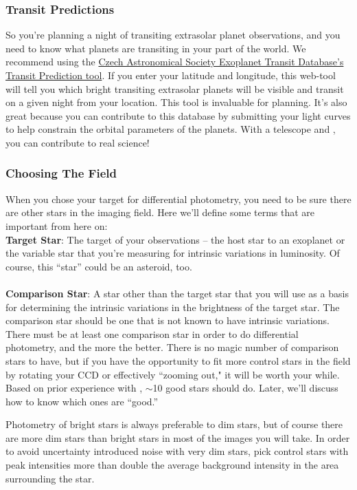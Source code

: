 \documentclass{article}
\begin{document}
\subsubsection{Transit Predictions}
So you're planning a night of transiting extrasolar planet observations, and you need to know what planets are transiting in your part of the world. We recommend using the \href{http://var2.astro.cz/ETD/predictions.php}{Czech Astronomical Society Exoplanet Transit Database's Transit Prediction tool}. If you enter your latitude and longitude, this web-tool will tell you which bright transiting extrasolar planets will be visible and transit on a given night from your location. This tool is invaluable for planning. It's also great because you can contribute to this database by submitting your light curves to help constrain the orbital parameters of the planets. With a telescope and \oscaar, you can contribute to real science!

\subsubsection{Choosing The Field}
When you chose your target for differential photometry, you need to be sure there are other stars in the imaging field. Here we'll define some terms that are important from here on:  \\ 

\noindent \textbf{Target Star}: The target of your observations -- the host star to an exoplanet or the variable star that you're measuring for intrinsic variations in luminosity. Of course, this ``star'' could be an asteroid, too. \\\\
\textbf{Comparison Star}: A star other than the target star that you will use as a basis for determining the intrinsic variations in the brightness of the target star. The comparison star should be one that is not known to have intrinsic variations. \\

There must be at least one comparison star in order to do differential photometry, and the more the better. There is no magic number of comparison stars to have, but if you have the opportunity to fit more control stars in the field by rotating your CCD or effectively ``zooming out," it will be worth your while. Based on prior experience with \oscaar, $ \sim $10 good stars should do. Later, we'll discuss how to know which ones are ``good.''

Photometry of bright stars is always preferable to dim stars, but of course there are more dim stars than bright stars in most of the images you will take. In order to avoid uncertainty introduced noise with very dim stars, pick control stars with peak intensities more than double the average background intensity in the area surrounding the star. 
\end{document}
